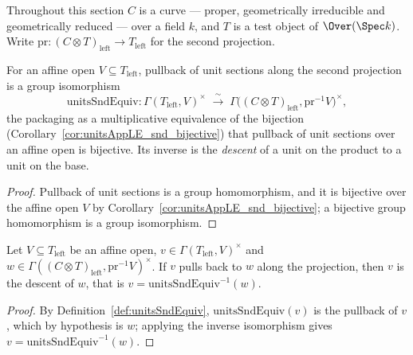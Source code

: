 Throughout this section \(C\) is a curve — proper, geometrically irreducible and geometrically
reduced — over a field \(k\), and \(T\) is a test object of \(\Over(\Spec k)\).  Write
\(\mathrm{pr} \colon (C \otimes T)_{\mathrm{left}} \to T_{\mathrm{left}}\) for the second
projection.

\begin{definition}
  \label{def:unitsSndEquiv}
  \leanok
  For an affine open \(V \subseteq T_{\mathrm{left}}\), pullback of unit sections along the
  second projection is a group isomorphism
  \[
    \mathrm{unitsSndEquiv} \colon \Gamma(T_{\mathrm{left}}, V)^{\times} \;\xrightarrow{\ \sim\
    }\; \Gamma\bigl((C \otimes T)_{\mathrm{left}}, \mathrm{pr}^{-1} V\bigr)^{\times},
  \]
  the packaging as a multiplicative equivalence of the bijection
  (Corollary~\ref{cor:unitsAppLE_snd_bijective}) that pullback of unit sections over an affine
  open is bijective.  Its inverse is the \emph{descent} of a unit on the product to a unit on
  the base.
\end{definition}
\begin{proof}
  \leanok
  Pullback of unit sections is a group homomorphism, and it is bijective over the affine open
  \(V\) by Corollary~\ref{cor:unitsAppLE_snd_bijective}; a bijective group homomorphism is a
  group isomorphism.
\end{proof}

\begin{lemma}
  \label{lem:unitsSndEquiv_symm_eq_of_unitsAppLE}
  \provenancetag{CUSTOM}
  \leanok
  Let \(V \subseteq T_{\mathrm{left}}\) be an affine open, \(v \in \Gamma(T_{\mathrm{left}},
  V)^{\times}\) and \(w \in \Gamma((C \otimes T)_{\mathrm{left}}, \mathrm{pr}^{-1}
  V)^{\times}\).  If \(v\) pulls back to \(w\) along the projection, then \(v\) is the descent
  of \(w\), that is \(v = \mathrm{unitsSndEquiv}^{-1}(w)\).
\end{lemma}
\begin{proof}
  \leanok
  By Definition~\ref{def:unitsSndEquiv}, \(\mathrm{unitsSndEquiv}(v)\) is the pullback of \(v\),
  which by hypothesis is \(w\); applying the inverse isomorphism gives \(v =
  \mathrm{unitsSndEquiv}^{-1}(w)\).
\end{proof}

